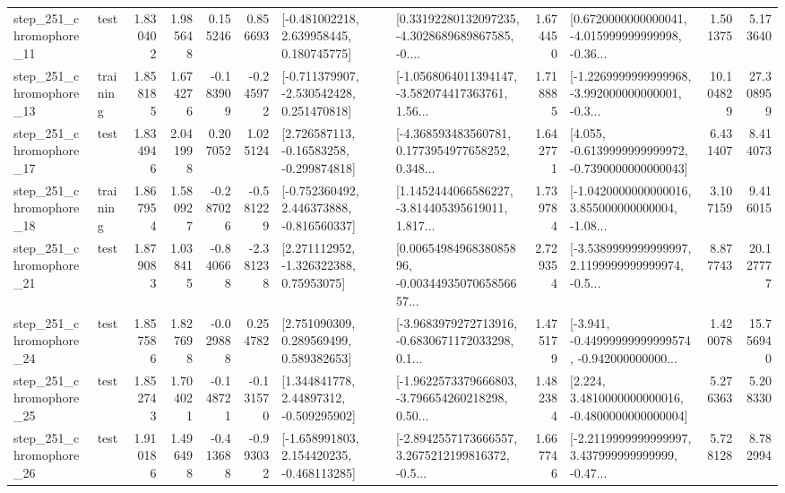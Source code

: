 \begin{tabular}{llrrrrllrlrr}
  step\_251\_chromophore\_11 &      test &      1.830402 &    1.985648 &      0.155246 &  0.856693 &    [-0.481002218, 2.639958445, 0.180745775] &  [0.33192280132097235, -4.3028689689867585, -0.... &       1.674450 &  [0.6720000000000041, -4.015999999999998, -0.36... &            1.501375 &          5.173640 \\
  step\_251\_chromophore\_13 &  training &      1.858185 &    1.674276 &     -0.183909 & -0.245972 &   [-0.711379907, -2.530542428, 0.251470818] &  [-1.0568064011394147, -3.582074417363761, 1.56... &       1.718885 &  [-1.2269999999999968, -3.992000000000001, -0.3... &           10.104829 &         27.308959 \\
  step\_251\_chromophore\_17 &      test &      1.834946 &    2.041998 &      0.207052 &  1.025124 &    [2.726587113, -0.16583258, -0.299874818] &  [-4.368593483560781, 0.1773954977658252, 0.348... &       1.642771 &  [4.055, -0.6139999999999972, -0.7390000000000043] &            6.431407 &          8.414073 \\
  step\_251\_chromophore\_18 &  training &      1.867954 &    1.580927 &     -0.287026 & -0.581229 &   [-0.752360492, 2.446373888, -0.816560337] &  [1.1452444066586227, -3.814405395619011, 1.817... &       1.739784 &  [-1.0420000000000016, 3.855000000000004, -1.08... &            3.107159 &          9.416015 \\
  step\_251\_chromophore\_21 &      test &      1.879083 &    1.038415 &     -0.840668 & -2.381238 &     [2.271112952, -1.326322388, 0.75953075] &  [0.0065498496838085896, -0.0034493507065856657... &       2.729354 &  [-3.5389999999999997, 2.1199999999999974, -0.5... &            8.877743 &         20.127777 \\
  step\_251\_chromophore\_24 &      test &      1.857586 &    1.827698 &     -0.029888 &  0.254782 &     [2.751090309, 0.289569499, 0.589382653] &  [-3.9683979272713916, -0.6830671172033298, 0.1... &       1.475179 &  [-3.941, -0.44999999999999574, -0.942000000000... &            1.420078 &         15.756940 \\
  step\_251\_chromophore\_25 &      test &      1.852743 &    1.704021 &     -0.148721 & -0.131570 &     [1.344841778, 2.44897312, -0.509295902] &  [-1.9622573379666803, -3.796654260218298, 0.50... &       1.482384 &   [2.224, 3.4810000000000016, -0.4800000000000004] &            5.276363 &          5.208330 \\
  step\_251\_chromophore\_26 &      test &      1.910186 &    1.496498 &     -0.413688 & -0.993032 &   [-1.658991803, 2.154420235, -0.468113285] &  [-2.8942557173666557, 3.2675212199816372, -0.5... &       1.667746 &  [-2.2119999999999997, 3.437999999999999, -0.47... &            5.728128 &          8.782994 \\

\end{tabular}
